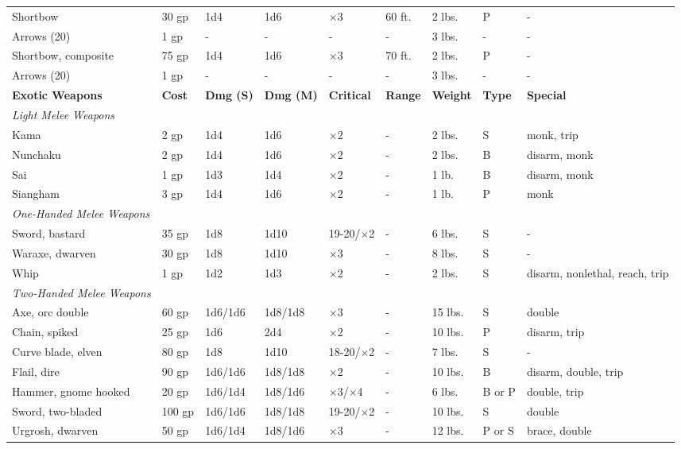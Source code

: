 \begin{table*}[]
\begin{tabular}{lllllllll}
 Shortbow & 30 gp & 1d4 & 1d6 & $\times$3 & 60 ft. & 2 lbs. & P & - \\
 Arrows (20) & 1 gp & - & - & - & - & 3 lbs. & - & - \\
 Shortbow, composite & 75 gp & 1d4 & 1d6 & $\times$3 & 70 ft. & 2 lbs. & P & - \\
 Arrows (20) & 1 gp & - & - & - & - & 3 lbs. & - & -\\
\textbf{Exotic Weapons} & \textbf{Cost} & \textbf{Dmg (S)} & \textbf{Dmg (M)} & \textbf{Critical} & \textbf{Range} & \textbf{Weight} & \textbf{Type} & \textbf{Special}\\
\textit{Light Melee Weapons} \\
 Kama & 2 gp & 1d4 & 1d6 & $\times$2 & - & 2 lbs. & S &  monk, trip \\
 Nunchaku & 2 gp & 1d4 & 1d6 & $\times$2 & - & 2 lbs. & B & disarm, monk \\
 Sai & 1 gp & 1d3 & 1d4 & $\times$2 & - & 1 lb. & B & disarm, monk \\
 Siangham & 3 gp & 1d4 & 1d6 & $\times$2 & - & 1 lb. & P & monk \\
\textit{One-Handed Melee Weapons} \\
 Sword, bastard & 35 gp & 1d8 & 1d10 & 19-20/$\times$2 & - & 6 lbs. & S & - \\
 Waraxe, dwarven & 30 gp & 1d8 & 1d10 & $\times$3 & - & 8 lbs. & S & - \\
 Whip & 1 gp & 1d2 & 1d3 & $\times$2 & - & 2 lbs. & S & disarm, nonlethal, reach, trip \\
 \textit{Two-Handed Melee Weapons} \\
 Axe, orc double & 60 gp & 1d6/1d6 & 1d8/1d8 & $\times$3 & - & 15 lbs. & S & double \\
 Chain, spiked & 25 gp & 1d6 & 2d4 & $\times$2 & - & 10 lbs. & P & disarm, trip \\
 Curve blade, elven & 80 gp & 1d8 & 1d10 & 18-20/$\times$2 & - & 7 lbs. & S & - \\
 Flail, dire & 90 gp & 1d6/1d6 & 1d8/1d8 & $\times$2 & - & 10 lbs. & B & disarm, double, trip \\
 Hammer, gnome hooked & 20 gp & 1d6/1d4 & 1d8/1d6 & $\times$3/$\times$4 & - & 6 lbs. & B or P & double, trip \\
 Sword, two-bladed & 100 gp & 1d6/1d6 & 1d8/1d8 & 19-20/$\times$2 & - & 10 lbs. & S & double \\
 Urgrosh, dwarven & 50 gp & 1d6/1d4 & 1d8/1d6 & $\times$3 & - & 12 lbs. & P or S & brace, double \\

\end{tabular}
\end{table*}
